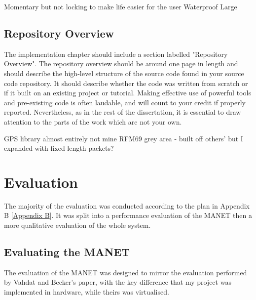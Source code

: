 \documentclass[12pt,a4paper]{report}
\newcommand{\newchapter}[2]{
    \setcounter{chapter}{#1}
    \setcounter{section}{0}
    \chapter*{#2}
    \addcontentsline{toc}{chapter}{#1 #2}
}
\begin{document}
Momentary but not locking to make life easier for the user 
Waterproof
Large



\section{Repository Overview}
The implementation chapter should include a section labelled "Repository Overview". The repository overview should be around one page in length and should describe the high-level structure of the source code found in your source code repository. It should describe whether the code was written from scratch or if it built on an existing project or tutorial. Making effective use of powerful tools and pre-existing code is often laudable, and will count to your credit if properly reported. Nevertheless, as in the rest of the dissertation, it is essential to draw attention to the parts of the work which are not your own.

GPS library almost entirely not mine
RFM69 grey area - built off others' but I expanded with fixed length packets? 


\newchapter{4}{Evaluation}
\setcounter{figure}{0}
The majority of the evaluation was conducted according to the plan in Appendix B [\hyperref[appendixB]{Appendix B}]. It was split into a performance evaluation of the MANET then a more qualitative evaluation of the whole system.

\section{Evaluating the MANET}
The evaluation of the MANET was designed to mirror the evaluation performed by Vahdat and Becker's paper, with the key difference that my project was implemented in hardware, while theirs was virtualised.
\end{document}
